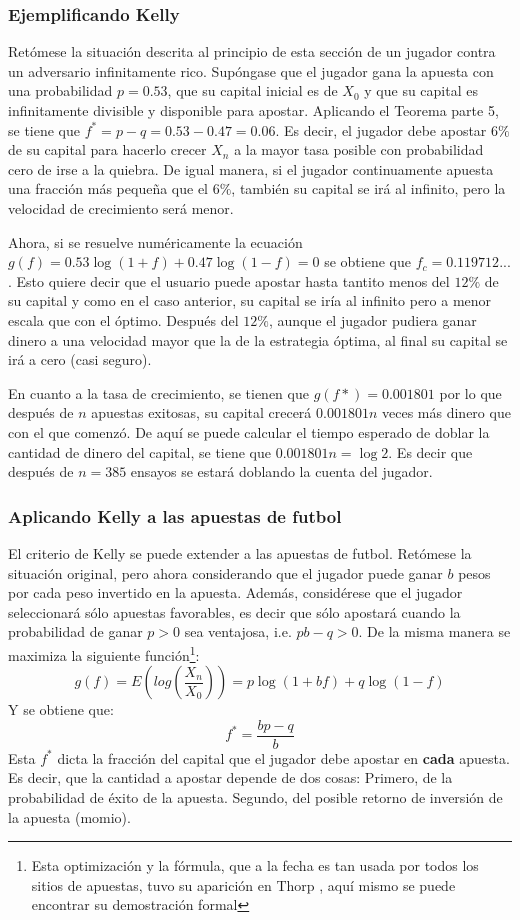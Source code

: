\subsubsection{Ejemplificando Kelly} %
Retómese la situación descrita al principio de esta sección de un jugador contra un adversario infinitamente rico. Supóngase que el jugador gana la apuesta con una probabilidad $p=0.53$, que su capital inicial es de $X_0$ y que su capital es infinitamente divisible y disponible para apostar. Aplicando el Teorema parte 5, se tiene que $f^* = p-q =0.53-0.47 = 0.06$. Es decir, el jugador debe apostar $6\%$ de su capital para hacerlo crecer $X_n$ a la mayor tasa posible con probabilidad cero de irse a la quiebra. De igual manera, si el jugador continuamente apuesta una fracción más pequeña que el $6\%$, también su capital se irá al infinito, pero la velocidad de crecimiento será menor.

Ahora, si se resuelve numéricamente la ecuación $g(f) = 0.53\log(1+f)+0.47\log(1-f)=0$ se obtiene que $f_c= 0.119712...$. Esto quiere decir que el usuario puede apostar hasta tantito menos del $12\%$ de su capital y como en el caso anterior, su capital se iría al infinito pero a menor escala que con el óptimo. Después del $12\%$, aunque el jugador pudiera ganar dinero a una velocidad mayor que la de la estrategia óptima, al final su capital se irá a cero (casi seguro). 

En cuanto a la tasa de crecimiento, se tienen que $g(f*)= 0.001801$ por lo que después de $n$ apuestas exitosas, su capital crecerá $0.001801n$ veces más dinero que con el que comenzó. De aquí se puede calcular el tiempo esperado de doblar la cantidad de dinero del capital, se tiene que $0.001801n=\log2$. Es decir que después de $n=385$ ensayos se estará doblando la cuenta del jugador.

\subsubsection{Aplicando Kelly a las apuestas de futbol} %
\label{subsubsection:aplicando_kelly_a_las_apuestas_de_futbol}

El criterio de Kelly se puede extender a las apuestas de futbol. Retómese la situación original, pero ahora considerando que el jugador puede ganar $b$ pesos por cada peso invertido en la apuesta. Además, considérese que el jugador seleccionará sólo apuestas favorables, es decir que sólo apostará cuando la probabilidad de ganar $p>0$ sea ventajosa, i.e. $pb - q > 0$.
De la misma manera se maximiza la siguiente función\footnote{Esta optimización y la fórmula, que a la fecha es tan usada por todos los sitios de apuestas, tuvo su aparición en  Thorp \cite{thorp1969optimal}, aquí mismo se puede encontrar su demostración formal}:
\[g(f) = E\left(log(\frac{X_n}{X_0})\right)=p\log(1+bf)+q\log(1-f)\]
Y se obtiene que:
\[f^* = \frac{bp -q}{b}\]
Esta $f^*$ dicta la fracción del capital que el jugador debe apostar en \textbf{cada} apuesta. Es decir, que la cantidad a apostar depende de dos cosas: Primero, de la probabilidad de éxito de la apuesta. Segundo, del posible retorno de inversión de la apuesta (momio).

